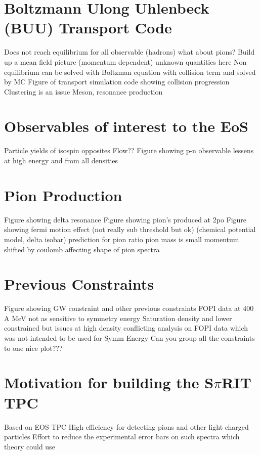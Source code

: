 \section{Boltzmann Ulong Uhlenbeck (BUU) Transport Code}
Does not reach equilibrium for all observable (hadrons) what about pions?
Build up a mean field picture (momentum dependent) unknown quantities here
Non equilibrium can be solved with Boltzman equation with collision term and solved by MC
Figure of transport simulation code showing collision progression 
Clustering is an issue 
Meson, resonance production 

\section{Observables of interest to the EoS}
Particle yields of isospin opposites 
Flow??
Figure showing p-n observable lessens at high energy and from all densities 

\section{Pion Production }
Figure showing delta resonance 
Figure showing pion's produced at 2po 
Figure showing fermi motion effect (not really sub threshold but ok)
(chemical potential model, delta isobar) prediction for pion ratio
pion mass is small momentum shifted by coulomb affecting shape of pion spectra

\section{Previous Constraints}
Figure showing GW constraint and other previous constraints 
FOPI data at 400 A MeV not as sensitive to symmetry energy 
Saturation density and lower constrained but issues at high density
conflicting analysis on FOPI data which was not intended to be used for Symm Energy
Can you group all the constraints to one nice plot???

\section{Motivation for building the S$\pi$RIT TPC}
Based on EOS TPC
High efficiency for detecting pions and other light charged particles 
Effort to reduce the experimental error bars on such spectra which theory could use


